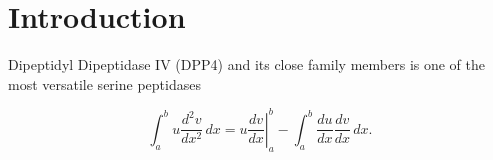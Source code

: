 \section{Introduction}
\label{intro} 

Dipeptidyl Dipeptidase IV (DPP4) and its close family members is one of the most versatile serine peptidases  

\begin{equation}
\label{eqn:drag}
	\int_a^bu\frac{d^2v}{dx^2}\,dx
	=\left.u\frac{dv}{dx}\right|_a^b
	-\int_a^b\frac{du}{dx}\frac{dv}{dx}\,dx.
\end{equation}
